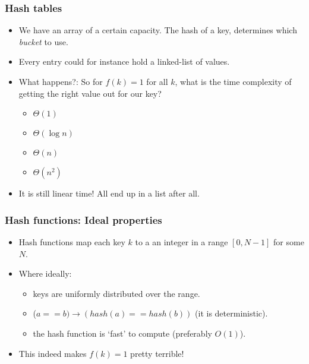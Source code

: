 \begin{frame}
	\frametitle{Hash tables}
		\begin{itemize}
			\item We have an array of a certain capacity.
		The hash of a key, determines which \textit{bucket} to use.
			\item Every entry could for instance hold a linked-list of values.
			\item What happens?:
		So for $f(k) = 1$ for all $k$, what is the time complexity of getting the right value out for our key?
		\begin{itemize}
			\item $\Theta(1)$
			\item $\Theta(\log n)$
			\item $\Theta(n)$
			\item $\Theta(n^2)$
		\end{itemize}
			\item It is still linear time! All end up in a list after all.
		\end{itemize}
\end{frame}

\begin{frame}
	\frametitle{Hash functions: Ideal properties}
	
		\begin{itemize}
			\item Hash functions map each key $k$ to a an integer in a range $[0, N-1]$ for some $N$.
			\item Where ideally:
			
			\begin{itemize}
				\item keys are uniformly distributed over the range.
					
				\item ($a == b) \to (\mathit{hash}(a) == \mathit{hash}(b))$ (it is deterministic).
					
				\item the hash function is `fast' to compute (preferably $O(1)$).
			\end{itemize}
			\item This indeed makes $f(k) = 1$ pretty terrible!
			\end{itemize}	
\end{frame}

